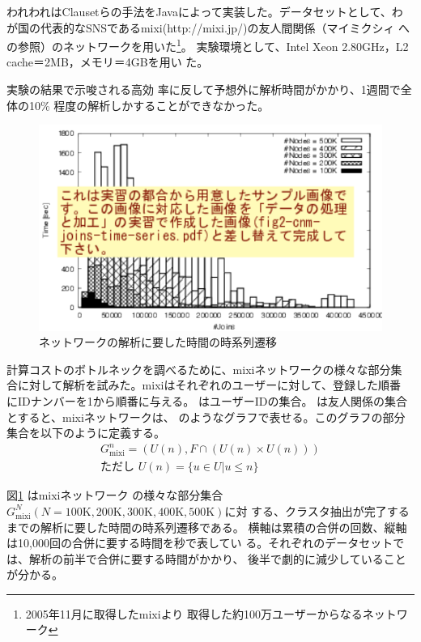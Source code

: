 \documentclass [a4j,11pt] {jsarticle}
\begin{document}
われわれはClausetらの手法をJavaによって実装した。データセットとして、わ
が国の代表的なSNSであるmixi(http://mixi.jp/)の友人間関係（マイミクシィ
への参照）のネットワークを用いた\footnote {2005年11月に取得したmixiより
取得した約100万ユーザーからなるネットワーク}。
実験環境として、Intel Xeon 2.80GHz，L2 cache＝2MB，メモリ＝4GBを用い
た。

実験の結果\cite{Clauset04}で示唆される高効
率に反して予想外に解析時間がかかり、1週間で全体の10\%
程度の解析しかすることができなかった。

\begin {figure}[htbp]
  \centerline {\includegraphics [width=0.80\linewidth]{fig2-cnm-joins-time-series.pdf}}
  \caption {ネットワークの解析に要した時間の時系列遷移}
  \label {fig: newman time diff}
\end{figure}

計算コストのボトルネックを調べるために、mixiネットワークの様々な部分集
合に対して解析を試みた。mixiはそれぞれのユーザーに対して、登録した順番
にIDナンバーを1から順番に与える。
はユーザーIDの集合。
は友人関係の集合とすると、mixiネットワークは、
のようなグラフで表せる。このグラフの部分集合を以下のように定義する。
%
\begin {align*}
  G_{\text {mixi}}^n = (U(n), F \cap (U(n) \times U(n))) \\
  \text {ただし } U(n) = \{ u \in U | u \le n \}
\end {align*}

図\ref {fig: newman time diff} はmixiネットワーク
の様々な部分集合$G_{\text {mixi}}^N (N = \text {100K}, \text {200K},
\text {300K}, \text {400K}, \text {500K})$に対
する、クラスタ抽出が完了するまでの解析に要した時間の時系列遷移である。
横軸は累積の合併の回数、縦軸は10,000回の合併に要する時間を秒で表してい
る。それぞれのデータセットでは、解析の前半で合併に要する時間がかかり、
後半で劇的に減少していることが分かる。
\end{document}
